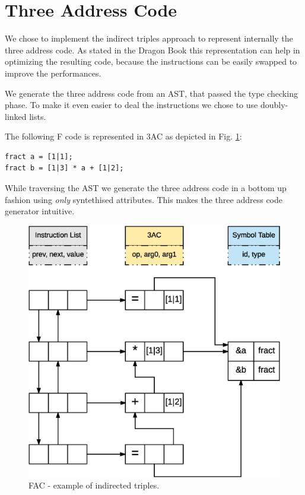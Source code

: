 \section{Three Address Code}
We chose to implement the indirect triples approach to represent internally
the three address code. As stated in the Dragon Book \cite{dragonbook} this 
representation
can help in optimizing the resulting code, because the instructions can be
easily swapped to improve the performances.

We generate the three address code from an AST, that passed the type checking
phase. To make it even easier to deal the instructions we chose to use
doubly-linked lists.

The following F code is represented in 3AC as depicted in Fig. 
\ref{fig:ind-trpl}:
\begin{verbatim}
fract a = [1|1];
fract b = [1|3] * a + [1|2];
\end{verbatim}

While traversing the AST we generate the three address code in a bottom up
fashion using \emph{only} syntethised attributes. This makes the three address
code generator intuitive.

\begin{figure}[H]
  \centering
  \includegraphics[width=.9\columnwidth]{img/eps/indirect_triples.eps}
  \caption{FAC - example of indirected triples.}
  \label{fig:ind-trpl}
\end{figure}
